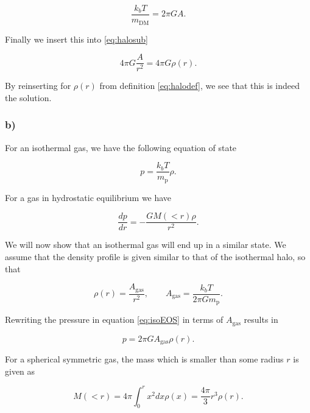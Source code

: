 \documentclass[a4paper]{article}
\begin{document}
\begin{equation*}
    \frac{k_b T}{m_\text{DM}} = 2\pi G A.
\end{equation*}

\noindent Finally we insert this into \eqref{eq:halosub}

\begin{equation*}
    4\pi G \frac{A}{r^2} = 4\pi G \rho(r).
\end{equation*}

\noindent By reinserting for $\rho(r)$ from definition \eqref{eq:halodef}, we see that this is
indeed the solution.

\subsubsection*{b)}

For an isothermal gas, we have the following equation of state

\begin{equation}\label{eq:isoEOS}
    p = \frac{k_b T}{m_\text{p}} \rho.
\end{equation}

\noindent For a gas in hydrostatic equilibrium we have

\begin{equation}\label{eq:hydrostatic}
    \frac{dp}{dr} = - \frac{GM(<r)\rho}{r^2}.
\end{equation}

\noindent We will now show that an isothermal gas will end up in a similar state. We assume
that the density profile is given similar to that of the isothermal halo, so that 

\begin{equation*}
    \rho (r) = \frac{A_\text{gas}}{r^2}, \qquad  A_\text{gas}  = \frac{k_b T}{2\pi G m_\text{p}}.
\end{equation*}

\noindent Rewriting the pressure in equation \eqref{eq:isoEOS} in terms of $ A_\text{gas} $ results in

\begin{equation}\label{eq:eossub}
    p = 2\pi G  A_\text{gas}  \rho (r).
\end{equation}

\noindent For a spherical symmetric gas, the mass which is smaller than some radius $r$ is
given as

\begin{equation}\label{eq:mass}
    M (<r) = 4\pi \int_0^r x^2 dx \rho(x)  = \frac{4\pi}{3}r^3\rho(r) .
\end{equation}
\end{document}
